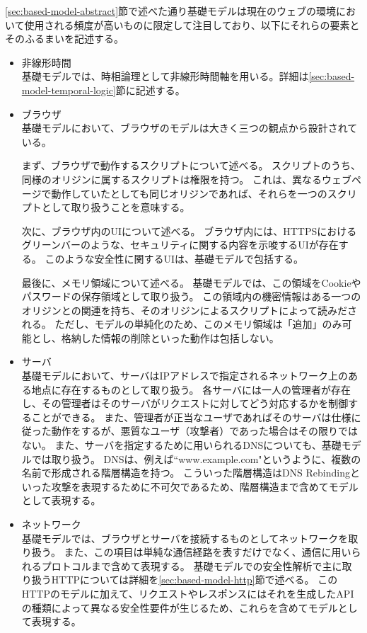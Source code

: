 \documentclass[12pt,a4paper]{jbook}
\begin{document}
\ref{sec:based-model-abstract}節で述べた通り基礎モデルは現在のウェブの環境において使用される頻度が高いものに限定して注目しており、以下にそれらの要素とそのふるまいを記述する。
\begin{itemize}
\item 非線形時間 \\
基礎モデルでは、時相論理として非線形時間軸を用いる。詳細は\ref{sec:based-model-temporal-logic}節に記述する。
\item ブラウザ \\
基礎モデルにおいて、ブラウザのモデルは大きく三つの観点から設計されている。

まず、ブラウザで動作するスクリプトについて述べる。
スクリプトのうち、同様のオリジンに属するスクリプトは権限を持つ。
これは、異なるウェブページで動作していたとしても同じオリジンであれば、それらを一つのスクリプトとして取り扱うことを意味する。

次に、ブラウザ内のUIについて述べる。
ブラウザ内には、HTTPSにおけるグリーンバーのような、セキュリティに関する内容を示唆するUIが存在する。
このような安全性に関するUIは、基礎モデルで包括する。

最後に、メモリ領域について述べる。
基礎モデルでは、この領域をCookieやパスワードの保存領域として取り扱う。
この領域内の機密情報はある一つのオリジンとの関連を持ち、そのオリジンによるスクリプトによって読みだされる。
ただし、モデルの単純化のため、このメモリ領域は「追加」のみ可能とし、格納した情報の削除といった動作は包括しない。
\item サーバ \\
基礎モデルにおいて、サーバはIPアドレスで指定されるネットワーク上のある地点に存在するものとして取り扱う。
各サーバには一人の管理者が存在し、その管理者はそのサーバがリクエストに対してどう対応するかを制御することができる。
また、管理者が正当なユーザであればそのサーバは仕様に従った動作をするが、悪質なユーザ（攻撃者）であった場合はその限りではない。
また、サーバを指定するために用いられるDNSについても、基礎モデルでは取り扱う。
DNSは、例えば``www.example.com"というように、複数の名前で形成される階層構造を持つ。
こういった階層構造はDNS Rebinding\cite{dns-rebinding}といった攻撃を表現するために不可欠であるため、階層構造まで含めてモデルとして表現する。
\item ネットワーク \\
基礎モデルでは、ブラウザとサーバを接続するものとしてネットワークを取り扱う。
また、この項目は単純な通信経路を表すだけでなく、通信に用いられるプロトコルまで含めて表現する。
基礎モデルでの安全性解析で主に取り扱うHTTPについては詳細を\ref{sec:based-model-http}節で述べる。
このHTTPのモデルに加えて、リクエストやレスポンスにはそれを生成したAPIの種類によって異なる安全性要件が生じるため、これらを含めてモデルとして表現する。
\end{itemize}
\end{document}

